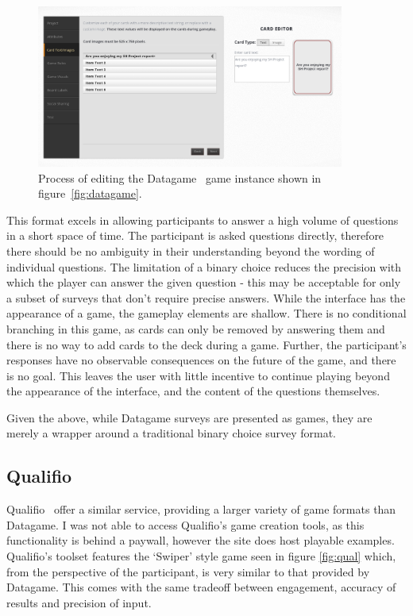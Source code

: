 \begin{figure}[!h]
	\centering
	\includegraphics[width=0.9\textwidth]{./images/context/dg_editor.png}
	\caption{Process of editing the Datagame~\cite{Datagame} game instance shown in figure~\ref{fig:datagame}.}
	\label{fig:dg_editor}
\end{figure}

This format excels in allowing participants to answer a high volume of questions in a short space of time. 
The participant is asked questions directly, therefore there should be no ambiguity in their understanding beyond the wording of individual questions. 
The limitation of a binary choice reduces the precision with which the player can answer the given question - this may be acceptable for only a subset of surveys that don't require precise answers.
While the interface has the appearance of a game, the gameplay elements are shallow. 
There is no conditional branching in this game, as cards can only be removed by answering them and there is no way to add cards to the deck during a game. 
Further, the participant's responses have no observable consequences on the future of the game, and there is no goal. This leaves the user with little incentive to continue playing beyond the appearance of the interface, and the content of the questions themselves.

Given the above, while Datagame surveys are presented as games, they are merely a wrapper around a traditional binary choice survey format.

\subsection{Qualifio}
Qualifio~\cite{Qualifio} offer a similar service, providing a larger variety of game formats than Datagame. 
I was not able to access Qualifio's game creation tools, as this functionality is behind a paywall, however the site does host playable examples. 
Qualifio's toolset features the `Swiper' style game seen in figure \ref{fig:qual} which, from the perspective of the participant, is very similar to that provided by Datagame. This comes with the same tradeoff between engagement, accuracy of results and precision of input.

